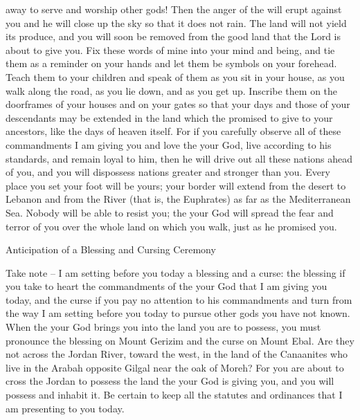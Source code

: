 {away to serve
and worship
other
gods!
Then the anger
of the {}
will erupt
against you and he will close up
the sky
so that
it does not
rain.
The land
will not
yield
its produce,
and you will soon
be removed
from
the good
land
that
the Lord
is about to give you.
Fix
these
words
of mine into your mind
and being,
and tie
them as a reminder
on
your hands
and let them be
symbols
on your forehead.
Teach
them
to your children
and speak
of them as you sit
in your house,
as you walk
along the road,
as you lie
down, and as you get up.
Inscribe
them on
the doorframes
of your houses
and on your gates
so
that your
days
and those
of your
descendants
may be extended
in the land
which
the {}
promised
to give
to your ancestors,
like the days
of heaven itself.
For
if
you carefully
observe
all
of these commandments
I am
giving
you and love
the {}
your God,
live
according to his standards,
and remain loyal to him,
then
he will drive
out all
these
nations
ahead
of you, and you will dispossess
nations
greater
and stronger
than you.
Every
place
you set
your foot
will be
yours; your border
will extend
from
the desert
to Lebanon
and from
the River
(that is, the Euphrates) as far as
the Mediterranean
Sea.
Nobody
will be able to resist
you;
the {}
your God
will spread
the fear
and terror
of you over
the whole
land
on which
you walk,
just
as he promised you.
\par }{\SH Anticipation of a Blessing and Cursing Ceremony
\par }{\PP {}Take note
– I am
setting
before
you today
a blessing
and a curse:
the blessing
if you take to
heart
the commandments
of the {}
your God
that
I am
giving
you today,
and the curse
if
you pay no
attention
to
his commandments
and turn
from
the way
I am
setting
before you today
to pursue
other
gods
you have
not
known.
When
the {}
your God
brings
you into
the land
you
are to possess,
you must pronounce
the blessing
on
Mount
Gerizim
and the curse
on
Mount
Ebal.
Are they
not
across
the Jordan River,
toward
the west,
in the land
of the Canaanites
who live
in the Arabah
opposite
Gilgal
near
the oak
of Moreh?
For
you
are about to cross
the Jordan
to possess
the land
the {}
your God
is giving
you, and you will possess
and inhabit it.
Be certain to keep
all
the statutes
and ordinances
that
I am
presenting
to you
today.

}
